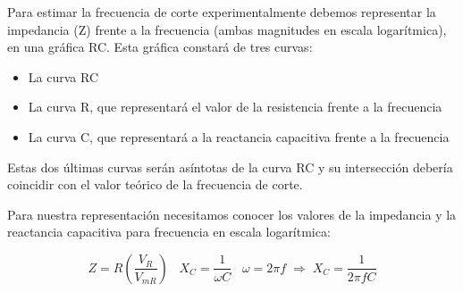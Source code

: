 \documentclass[a4paper,12pt,titlepage]{article}
\begin{document}
Para estimar la frecuencia de corte experimentalmente debemos representar la impedancia (Z) frente a la frecuencia (ambas magnitudes en escala logarítmica), en una gráfica RC. Esta gráfica constará de tres curvas:
\begin{itemize}
    \item La curva RC
    \item La curva R, que representará el valor de la resistencia frente a la frecuencia
    \item La curva C, que representará a la reactancia capacitiva frente a la frecuencia
\end{itemize}
Estas dos últimas curvas serán asíntotas de la curva RC y su intersección debería coincidir con el valor teórico de la frecuencia de corte.
\par Para nuestra representación necesitamos conocer los valores de la impedancia y la reactancia capacitiva para frecuencia en escala logarítmica:

\begin{equation}
    \label{Imepedancia y capacitancia}
    Z=R(\frac{V_{R}}{V_{mR}}) \; \; \; X_{C}=\frac{1}{\omega C} \; \; \; \omega = 2\pi f \; \Rightarrow \; X_{C}=\frac{1}{2\pi fC}
\end{equation}
\end{document}
